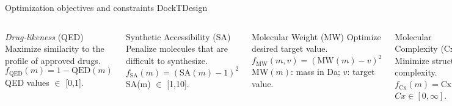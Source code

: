 \documentclass[aspectratio=169,xcolor=dvipsnames]{beamer}
\begin{document}
\begin{frame}{Optimization objectives and constraints \hfill {\footnotesize \alert{DockTDesign}}}
    \vspace{-1em}
    \begin{columns}[t]

        \begin{block}{\textit{Drug-likeness} (QED)}
            Maximize similarity to the profile of approved drugs.
            \[
                f_{\text{QED}}(m) = 1 - \text{QED}(m)
            \]
            QED values $\in$ [0,1].
        \end{block}


        \begin{block}{Synthetic Accessibility (SA)}
            Penalize molecules that are difficult to synthesize.
            \[
                f_{\text{SA}}(m) = (\text{SA}(m) - 1)^2
            \]
            SA(m) $\in$ [1,10].
        \end{block}


        \begin{block}{Molecular Weight (MW)}
            Optimize desired target value.
            \[
                f_{\text{MW}}(m, v) = (\text{MW}(m) - v)^2
            \]
            MW$(m)$: mass in Da; $v$: target value.
        \end{block}

        \vspace{1.2em}

        \begin{block}{Molecular Complexity (Cx)}
            Minimize structural complexity.
            \[
                f_{\text{Cx}}(m) = \text{Cx}(m)^2
            \]
            $Cx \in [0, \infty]$.
        \end{block}

    \end{columns}
\end{frame}
\end{document}
